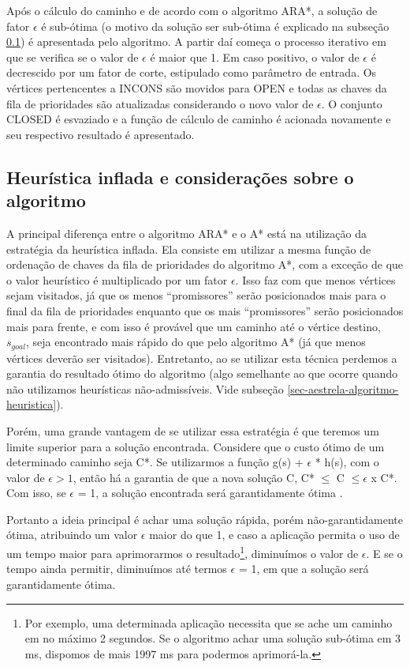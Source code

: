Após o cálculo do caminho e de acordo com o algoritmo ARA*, a solução de fator $\epsilon$ é sub-ótima (o motivo da solução ser sub-ótima é explicado na subseção \ref{sec-dinamicos-ara-consideracoes}) é apresentada pelo algoritmo. A partir daí começa o processo iterativo em que se verifica se o valor de $\epsilon$ é maior que 1. Em caso positivo, o valor de $\epsilon$ é decrescido por um fator de corte, estipulado como parâmetro de entrada. Os vértices pertencentes a INCONS são movidos para OPEN e todas as chaves da fila de prioridades são atualizadas considerando o novo valor de $\epsilon$. O conjunto CLOSED é esvaziado e a função de cálculo de caminho é acionada novamente e seu respectivo resultado é apresentado.

\subsection{Heurística inflada e considerações sobre o algoritmo}
\label{sec-dinamicos-ara-consideracoes}

A principal diferença entre o algoritmo ARA* e o A* está na utilização da estratégia da heurística inflada. Ela consiste em utilizar a mesma função de ordenação de chaves da fila de prioridades do algoritmo A*, com a exceção de que o valor heurístico é multiplicado por um fator $\epsilon$. Isso faz com que menos vértices sejam visitados, já que os menos ``promissores'' serão posicionados mais para o final da fila de prioridades enquanto que os mais ``promissores'' serão posicionados mais para frente, e com isso é provável que um caminho até o vértice destino, $s_{goal}$, seja encontrado mais rápido do que pelo algoritmo A* (já que menos vértices deverão ser visitados). Entretanto, ao se utilizar esta técnica perdemos a garantia do resultado ótimo do algoritmo (algo semelhante ao que ocorre quando não utilizamos heurísticas não-admissíveis. Vide subseção \ref{sec-aestrela-algoritmo-heuristica}).

Porém, uma grande vantagem de se utilizar essa estratégia é que teremos um limite superior para a solução encontrada. Considere que o custo ótimo de um determinado caminho seja C*. Se utilizarmos a função g(s) + $\epsilon$ * h(s), com o valor de $\epsilon > 1$, então há a garantia de que a nova solução C, C* $\leq$ C $\leq \epsilon$ x C*. Com isso, se $\epsilon$ = 1, a solução encontrada será garantidamente ótima \cite{moura2010estudo}.

Portanto a ideia principal é achar uma solução rápida, porém não-garantidamente ótima, atribuindo um valor $\epsilon$ maior do que 1, e caso a aplicação permita o uso de um tempo maior para aprimorarmos o resultado\footnote{Por exemplo, uma determinada aplicação necessita que se ache um caminho em no máximo 2 segundos. Se o algoritmo achar uma solução sub-ótima em 3 ms, dispomos de mais 1997 ms para podermos aprimorá-la.}, diminuímos o valor de $\epsilon$. E se o tempo ainda permitir, diminuímos até termos $\epsilon$ = 1, em que a solução será garantidamente ótima. 

